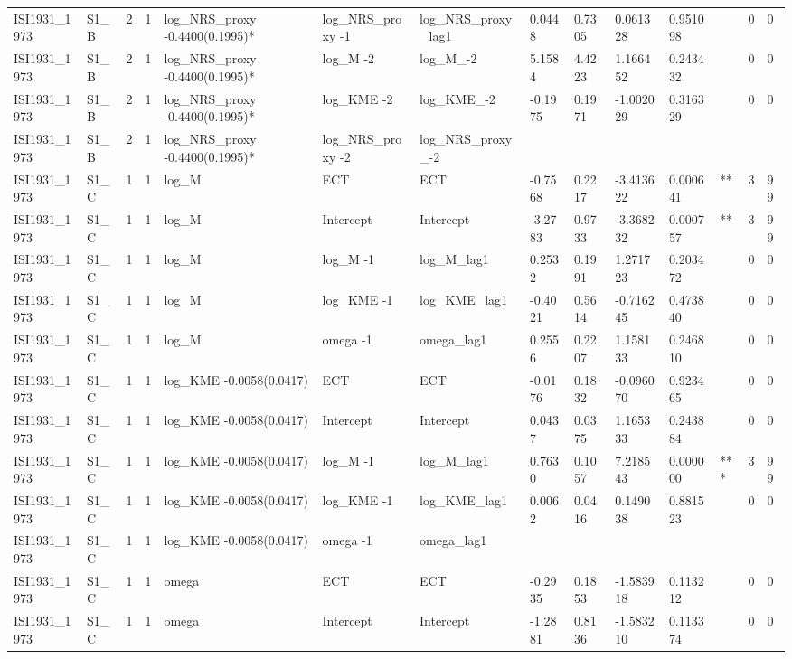 \begin{tabular}{llllllllllllll}
ISI1931\_1973 & S1\_B & 2 & 1 & log\_NRS\_proxy -0.4400(0.1995)* & log\_NRS\_proxy -1 & log\_NRS\_proxy\_lag1 & 0.0448 & 0.7305 & 0.061328 & 0.951098 &  & 0 & 0 \\
ISI1931\_1973 & S1\_B & 2 & 1 & log\_NRS\_proxy -0.4400(0.1995)* & log\_M -2 & log\_M\_-2 & 5.1584 & 4.4223 & 1.166452 & 0.243432 &  & 0 & 0 \\
ISI1931\_1973 & S1\_B & 2 & 1 & log\_NRS\_proxy -0.4400(0.1995)* & log\_KME -2 & log\_KME\_-2 & -0.1975 & 0.1971 & -1.002029 & 0.316329 &  & 0 & 0 \\
ISI1931\_1973 & S1\_B & 2 & 1 & log\_NRS\_proxy -0.4400(0.1995)* & log\_NRS\_proxy -2 & log\_NRS\_proxy\_-2 &  &  &  &  &  &  &  \\
ISI1931\_1973 & S1\_C & 1 & 1 & log\_M & ECT & ECT & -0.7568 & 0.2217 & -3.413622 & 0.000641 & ** & 3 & 99 \\
ISI1931\_1973 & S1\_C & 1 & 1 & log\_M & Intercept & Intercept & -3.2783 & 0.9733 & -3.368232 & 0.000757 & ** & 3 & 99 \\
ISI1931\_1973 & S1\_C & 1 & 1 & log\_M & log\_M -1 & log\_M\_lag1 & 0.2532 & 0.1991 & 1.271723 & 0.203472 &  & 0 & 0 \\
ISI1931\_1973 & S1\_C & 1 & 1 & log\_M & log\_KME -1 & log\_KME\_lag1 & -0.4021 & 0.5614 & -0.716245 & 0.473840 &  & 0 & 0 \\
ISI1931\_1973 & S1\_C & 1 & 1 & log\_M & omega -1 & omega\_lag1 & 0.2556 & 0.2207 & 1.158133 & 0.246810 &  & 0 & 0 \\
ISI1931\_1973 & S1\_C & 1 & 1 & log\_KME -0.0058(0.0417) & ECT & ECT & -0.0176 & 0.1832 & -0.096070 & 0.923465 &  & 0 & 0 \\
ISI1931\_1973 & S1\_C & 1 & 1 & log\_KME -0.0058(0.0417) & Intercept & Intercept & 0.0437 & 0.0375 & 1.165333 & 0.243884 &  & 0 & 0 \\
ISI1931\_1973 & S1\_C & 1 & 1 & log\_KME -0.0058(0.0417) & log\_M -1 & log\_M\_lag1 & 0.7630 & 0.1057 & 7.218543 & 0.000000 & *** & 3 & 99 \\
ISI1931\_1973 & S1\_C & 1 & 1 & log\_KME -0.0058(0.0417) & log\_KME -1 & log\_KME\_lag1 & 0.0062 & 0.0416 & 0.149038 & 0.881523 &  & 0 & 0 \\
ISI1931\_1973 & S1\_C & 1 & 1 & log\_KME -0.0058(0.0417) & omega -1 & omega\_lag1 &  &  &  &  &  &  &  \\
ISI1931\_1973 & S1\_C & 1 & 1 & omega & ECT & ECT & -0.2935 & 0.1853 & -1.583918 & 0.113212 &  & 0 & 0 \\
ISI1931\_1973 & S1\_C & 1 & 1 & omega & Intercept & Intercept & -1.2881 & 0.8136 & -1.583210 & 0.113374 &  & 0 & 0 \\

\end{tabular}

